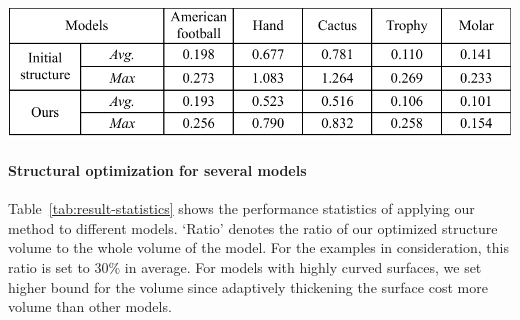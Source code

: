 \begin{table}[htb]
\caption{\label{tab:result-validation}Statistics of the simulation tests for the hand model.
    10 records of displacement (disp., in mm) and stress (strs., in MPa) are listed.
    First two rows are the results of uniform frame and the last two rows are our results .}
\centering
\includegraphics[width=\linewidth]{Tables/table1}
\end{table}




\paragraph{Structural optimization for several models}
Table~\ref{tab:result-statistics} shows the performance statistics of applying our method to different models.
`Ratio' denotes the ratio of our optimized structure volume to the whole volume of the model.
For the examples in consideration, this ratio is set to $30\%$ in average.
For models with highly curved surfaces, we set higher bound for the volume since adaptively thickening the surface cost more volume than other models.


